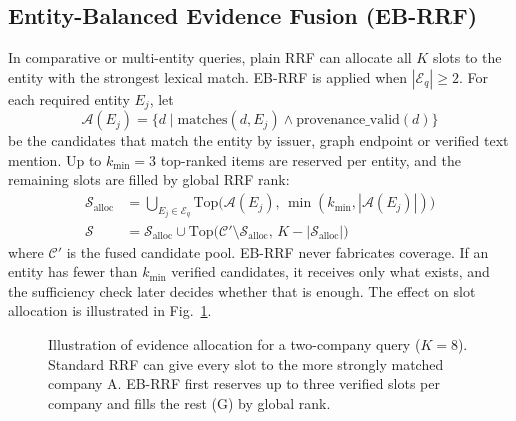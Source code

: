 \documentclass[conference]{IEEEtran}
\begin{document}
\subsection{Entity-Balanced Evidence Fusion (EB-RRF)}
In comparative or multi-entity queries, plain RRF can allocate all $K$ slots to the entity with the strongest lexical match. EB-RRF is applied when $|\mathcal{E}_q|\ge 2$. For each required entity $E_j$, let
\begin{equation}
\mathcal{A}(E_j) = \{d \mid \mathrm{matches}(d,E_j) \wedge \mathrm{provenance\_valid}(d)\}
\end{equation}
be the candidates that match the entity by issuer, graph endpoint or verified text mention. Up to $k_{\min}=3$ top-ranked items are reserved per entity, and the remaining slots are filled by global RRF rank:
\begin{align}
\mathcal{S}_{\mathrm{alloc}} &= \textstyle\bigcup_{E_j\in\mathcal{E}_q} \mathrm{Top}\big(\mathcal{A}(E_j),\, \min(k_{\min},|\mathcal{A}(E_j)|)\big)\\
\mathcal{S} &= \mathcal{S}_{\mathrm{alloc}} \cup \mathrm{Top}\big(\mathcal{C}'\setminus\mathcal{S}_{\mathrm{alloc}},\, K-|\mathcal{S}_{\mathrm{alloc}}|\big)
\end{align}
where $\mathcal{C}'$ is the fused candidate pool. EB-RRF never fabricates coverage. If an entity has fewer than $k_{\min}$ verified candidates, it receives only what exists, and the sufficiency check later decides whether that is enough. The effect on slot allocation is illustrated in Fig.~\ref{fig:ebrrf}.

\begin{figure}[t]
\centering
{}
\caption{Illustration of evidence allocation for a two-company query ($K=8$). Standard RRF can give every slot to the more strongly matched company A. EB-RRF first reserves up to three verified slots per company and fills the rest (G) by global rank.}
\label{fig:ebrrf}
\end{figure}
\end{document}
